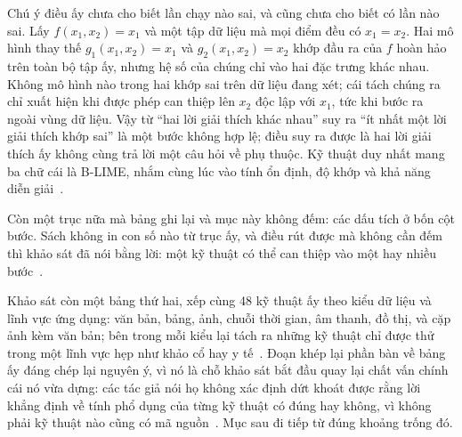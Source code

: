 Chú ý điều ấy chưa cho biết lần chạy nào sai, và cũng chưa cho biết có lần nào
sai. Lấy $f(x_1,x_2) = x_1$ và một tập dữ liệu mà mọi điểm đều có $x_1 = x_2$.
Hai mô hình thay thế $g_1(x_1,x_2) = x_1$ và $g_2(x_1,x_2) = x_2$ khớp đầu ra
của $f$ hoàn hảo trên toàn bộ tập ấy, nhưng hệ số của chúng chỉ vào hai đặc
trưng khác nhau. Không mô hình nào trong hai khớp sai trên dữ liệu đang xét; cái
tách chúng ra chỉ xuất hiện khi được phép can thiệp lên $x_2$ độc lập với $x_1$,
tức khi bước ra ngoài vùng dữ liệu. Vậy từ \enquote{hai lời giải thích khác
nhau} suy ra \enquote{ít nhất một lời giải thích khớp sai} là một bước không
hợp lệ; điều suy ra được là hai lời giải thích ấy không cùng trả lời một câu hỏi
về phụ thuộc. Kỹ thuật
duy nhất mang ba chữ cái là B-LIME, nhắm cùng lúc vào tính ổn định, độ khớp và
khả năng diễn giải~\autocite{p22whichlime}.

Còn một trục nữa mà bảng ghi lại và mục này không đếm: các dấu tích ở bốn cột
bước. Sách không in con số nào từ trục ấy, và điều rút được mà không cần đếm thì
khảo sát đã nói bằng lời: một kỹ thuật có thể can thiệp vào một hay nhiều
bước~\autocite{p22whichlime}.

Khảo sát còn một bảng thứ hai, xếp cùng 48 kỹ thuật ấy theo kiểu dữ liệu và
lĩnh vực ứng dụng: văn bản, bảng, ảnh, chuỗi thời gian, âm thanh, đồ thị, và
cặp ảnh kèm văn bản; bên trong mỗi kiểu lại tách ra những kỹ thuật chỉ được thử
trong một lĩnh vực hẹp như khảo cổ hay y tế~\autocite{p22whichlime}. Đoạn khép
lại phần bàn về bảng ấy đáng chép lại nguyên ý, vì nó là chỗ khảo sát bắt đầu quay lại
chất vấn chính cái nó vừa dựng: các tác giả nói họ không xác định dứt khoát
được rằng lời khẳng định về tính phổ dụng của từng kỹ thuật có đúng hay không,
vì không phải kỹ thuật nào cũng có mã nguồn~\autocite{p22whichlime}. Mục sau
đi tiếp từ đúng khoảng trống đó.
